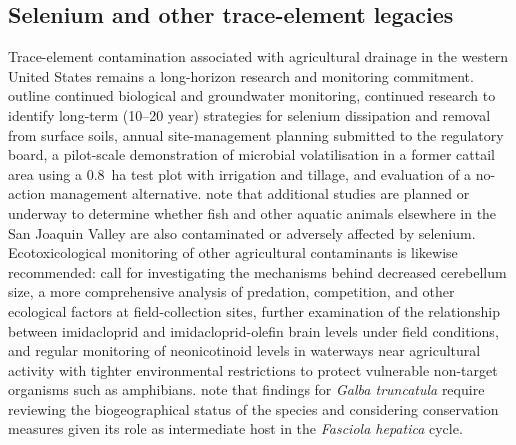 \documentclass[11pt]{article}
\begin{document}
\subsection{Selenium and other trace-element legacies}
Trace-element contamination associated with agricultural drainage in the western United States remains a long-horizon research and monitoring commitment. \textcite{BENSON1993} outline continued biological and groundwater monitoring, continued research to identify long-term (10--20 year) strategies for selenium dissipation and removal from surface soils, annual site-management planning submitted to the regulatory board, a pilot-scale demonstration of microbial volatilisation in a former cattail area using a 0.8~ha test plot with irrigation and tillage, and evaluation of a no-action management alternative. \textcite{SAIKI1987} note that additional studies are planned or underway to determine whether fish and other aquatic animals elsewhere in the San Joaquin Valley are also contaminated or adversely affected by selenium. Ecotoxicological monitoring of other agricultural contaminants is likewise recommended: \textcite{Campbell2023} call for investigating the mechanisms behind decreased cerebellum size, a more comprehensive analysis of predation, competition, and other ecological factors at field-collection sites, further examination of the relationship between imidacloprid and imidacloprid-olefin brain levels under field conditions, and regular monitoring of neonicotinoid levels in waterways near agricultural activity with tighter environmental restrictions to protect vulnerable non-target organisms such as amphibians. \textcite{Dreyfuss2018} note that findings for \textit{Galba truncatula} require reviewing the biogeographical status of the species and considering conservation measures given its role as intermediate host in the \textit{Fasciola hepatica} cycle.
\end{document}
